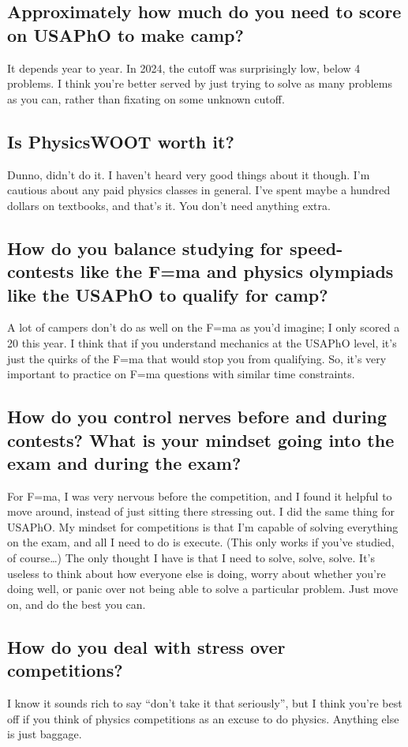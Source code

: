 \documentclass[11pt]{article}
\begin{document}
\subsection*{Approximately how much do you need to score on USAPhO to make camp?}
It depends year to year. In 2024, the cutoff was surprisingly low, below 4 problems. I think you’re better served by just trying to solve as many problems as you can, rather than fixating on some unknown cutoff.
\subsection*{Is PhysicsWOOT worth it?}
Dunno, didn’t do it. I haven’t heard very good things about it though. I’m cautious about any paid physics classes in general. I’ve spent maybe a hundred dollars on textbooks, and that’s it. You don’t need anything extra.
\subsection*{How do you balance studying for speed-contests like the F=ma and physics olympiads like the USAPhO to qualify for camp?}
A lot of campers don’t do as well on the F=ma as you’d imagine; I only scored a 20 this year. I think that if you understand mechanics at the USAPhO level, it’s just the quirks of the F=ma that would stop you from qualifying. So, it’s very important to practice on F=ma questions with similar time constraints.
\subsection*{How do you control nerves before and during contests? What is your mindset going into the exam and during the exam?}
For F=ma, I was very nervous before the competition, and I found it helpful to move around, instead of just sitting there stressing out. I did the same thing for USAPhO. My mindset for competitions is that I’m capable of solving everything on the exam, and all I need to do is execute. (This only works if you’ve studied, of course…) The only thought I have is that I need to solve, solve, solve. It’s useless to think about how everyone else is doing, worry about whether you’re doing well, or panic over not being able to solve a particular problem. Just move on, and do the best you can.
\subsection*{How do you deal with stress over competitions?}
I know it sounds rich to say “don’t take it that seriously”, but I think you’re best off if you think of physics competitions as an excuse to do physics. Anything else is just baggage.
\end{document}
